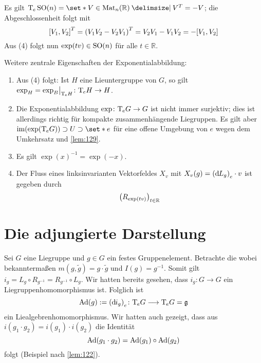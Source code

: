 \begin{beispiel*}[{name=[Liealgebra von $\SO(n)$]}]
	Es gilt $\Tmap_e\SO(n) = \set*{V \in \Mat_n(\mathbb{R}) \given V^T =-V}$; die Abgeschlossenheit folgt mit
	\[
		\benbrace*{V_1,V_2}^T = \enbrace*{V_1 V_2 - V_2 V_1}^T = V_2 V_1 - V_1 V_2 = -\benbrace*{V_1,V_2}
	\]
	Aus (4) folgt nun $\exp(tv) \in \SO(n)$ für alle $t \in \mathbb{R}$.
\end{beispiel*}

\begin{bemerkung*}[{name=[weitere Eigenschaften der Exponentialabbildung]}]
	Weitere zentrale Eigenschaften der Exponentialabbildung:
	\begin{enumerate}[1)]
		\item Aus (4) folgt: Ist $H$ eine Lieuntergruppe von $G$, so gilt $\exp_H  = \exp_B\!\big|_{\Tmap_e H} \colon \Tmap_e H \to H$.
		\item Die Exponentialabbildung $\exp \colon \Tmap_e G \to G$ ist nicht immer surjektiv; dies ist allerdings richtig für kompakte zusammenhängende Liegruppen.
		Es gilt aber $\im \enbrace*{\exp (\Tmap_e G)} \supset U \supset \set*{e}$ für eine offene Umgebung von $e$ wegen dem Umkehrsatz und \cref{lem:129}.
		\item Es gilt $\exp(x)^{-1} = \exp(-x)$.
		\item Der Fluss eines linksinvarianten Vektorfeldes $X_v$ mit $X_v(g) = \enbrace*{\mathd L_g}_e \cdot v$ ist gegeben durch
		\[
			\enbrace*{R_{\exp(tv)}}_{t \in \mathbb{R}}
		\]
	\end{enumerate}
\end{bemerkung*}

\section{Die adjungierte Darstellung} %
\label{sec:15}
Sei $G$ eine Liegruppe und $g \in G$ ein festes Gruppenelement. Betrachte die 
wobei bekanntermaßen $m(g,\tilde{g})= g \cdot \tilde{g}$ und $I(g)=g^{-1}$. 
Somit gilt $i_g = L_g \circ R_{g^{-1}} = R_{g^{-1}} \circ L_g$.
Wir hatten bereits gesehen, dass $i_g \colon G \to G$ ein Liegruppenhomomorphismus ist.
Folglich ist 
\[
	\Ad(g) := \enbrace*{\mathd i_g}_e \colon \Tmap_e G \longrightarrow \Tmap_eG = \mathfrak{g}
\]
ein Liealgebrenhomomorphismus.
Wir hatten auch gezeigt, dass aus $i(g_1 \cdot g_2) = i(g_1) \cdot i(g_2)$ die Identität 
\[
	\Ad(g_1 \cdot g_2) = \Ad(g_1) \circ \Ad(g_2)
\]
folgt (Beispiel nach \cref{lem:122}).

